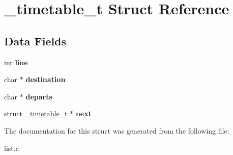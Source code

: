 \hypertarget{struct__timetable__t}{}\section{\+\_\+timetable\+\_\+t Struct Reference}
\label{struct__timetable__t}
\subsection*{Data Fields}
\begin{DoxyCompactItemize}
\item 
\hypertarget{struct__timetable__t_a1bafc9a0722f2aefddadc94467347cde}{}int {\bfseries line}\label{struct__timetable__t_a1bafc9a0722f2aefddadc94467347cde}

\item 
\hypertarget{struct__timetable__t_a7c783e14de0c40e1ac2b499fdbda88fd}{}char $\ast$ {\bfseries destination}\label{struct__timetable__t_a7c783e14de0c40e1ac2b499fdbda88fd}

\item 
\hypertarget{struct__timetable__t_a30dc74e3be1a2b364d408337ff9115ad}{}char $\ast$ {\bfseries departs}\label{struct__timetable__t_a30dc74e3be1a2b364d408337ff9115ad}

\item 
\hypertarget{struct__timetable__t_a1c49830312d2d5cc9015faf8ff846239}{}struct \hyperlink{struct__timetable__t}{\+\_\+timetable\+\_\+t} $\ast$ {\bfseries next}\label{struct__timetable__t_a1c49830312d2d5cc9015faf8ff846239}

\end{DoxyCompactItemize}


The documentation for this struct was generated from the following file\+:\begin{DoxyCompactItemize}
\item 
list.\+c\end{DoxyCompactItemize}
